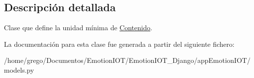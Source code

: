 \subsection{Descripción detallada}
Clase que define la unidad mínima de \hyperlink{classappEmotionIOT_1_1models_1_1Contenido}{Contenido}. 

La documentación para esta clase fue generada a partir del siguiente fichero\+:\begin{DoxyCompactItemize}
\item 
/home/grego/\+Documentos/\+Emotion\+I\+O\+T/\+Emotion\+I\+O\+T\+\_\+\+Django/app\+Emotion\+I\+O\+T/models.\+py\end{DoxyCompactItemize}
